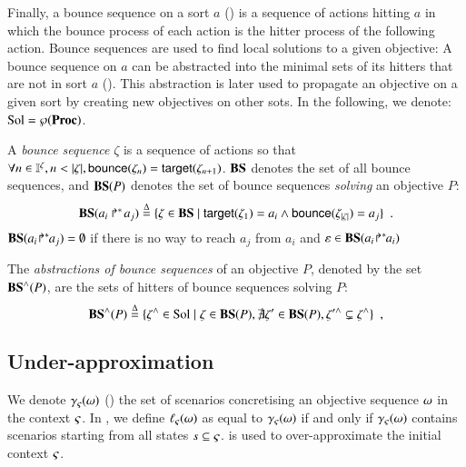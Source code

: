 Finally, a bounce sequence on a sort $a$ () is a sequence of actions hitting $a$
in which the bounce process of each action is the hitter process of the following action.
Bounce sequences are used to find local solutions to a given objective:
%
A bounce sequence on $a$ can be abstracted into the minimal sets of its hitters that are not in sort $a$ ().
This abstraction is later used to propagate an objective on a given sort
by creating new objectives on other sots.
In the following, we denote: $\mathrm{Sol} = \wp(\mathbf{Proc})$.
\begin{definition}
\label{def:bs}
  A \emph{bounce sequence} $\zeta$ is a sequence of actions so that $\forall n \in \mathbb{I}^{\zeta}, n < |\zeta|, \mathsf{bounce}(\zeta_{n}) = \mathsf{target}(\zeta_{n+1})$.
  $\mathbf{BS}$ denotes the set of all bounce sequences, and
  $\mathbf{BS}(P)$ denotes the set of bounce sequences \emph{solving} an objective $P$:
  \[
    \mathbf{BS}(\mbox{$a_i\Rsh^*\!a_j$}) \stackrel{\Delta}= \{ \zeta \in \mathbf{BS} \mid \mathsf{target}(\zeta_1)= a_i \wedge \mathsf{bounce}(\zeta_{|\zeta|}) = a_j \} \enspace.
  \]
  $\mathbf{BS}({a_i\!\Rsh^*\!\!a_j}) = \emptyset$ if there is no way to reach $a_j$ from $a_i$
  and $\varepsilon \in \mathbf{BS}({a_i\!\Rsh^*\!\!a_i})$
\end{definition}
%
\begin{definition}[$\aBS:\Obj \rightarrow \powerset(\Sol)$]
\label{def:aBS}
  The \emph{abstractions of bounce sequences} of an objective $P$, denoted by the set $\mathbf{BS}^\wedge(P)$, are the sets of hitters of bounce sequences solving $P$:
  \[
    \mathbf{BS}^\wedge(P) \stackrel{\Delta}= \{ \zeta^\wedge \in \mathrm{Sol} \mid \zeta \in \mathbf{BS}(P), \nexists \zeta' \in \mathbf{BS}(P), \zeta'^\wedge \subsetneq \zeta^\wedge \} \enspace,
  \]
\end{definition}



\subsection{Under-approximation}
\label{ssec:ua}

We denote $\gamma_\varsigma(\omega)$ () the set of scenarios concretising an objective sequence $\omega$ in the context $\varsigma$.
In , we define $\ell_\varsigma(\omega)$ as equal to $\gamma_\varsigma(\omega)$ if and only if $\gamma_\varsigma(\omega)$ contains scenarios starting from all states $s \subseteq \varsigma$.
 is used to over-approximate the initial context $\varsigma$.

